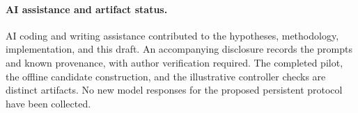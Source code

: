 \documentclass[sigconf,anonymous]{aamas}
\begin{document}
\paragraph{AI assistance and artifact status.}
AI coding and writing assistance contributed to the hypotheses, methodology, implementation, and this draft. An accompanying disclosure records the prompts and known provenance, with author verification required. The completed pilot, the offline candidate construction, and the illustrative controller checks are distinct artifacts. No new model responses for the proposed persistent protocol have been collected.



\end{document}
